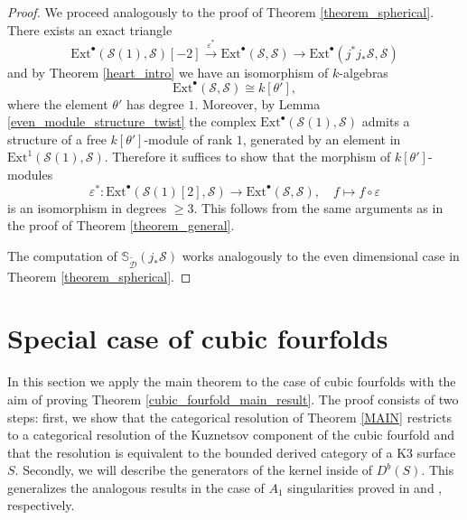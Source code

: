 \documentclass[a4paper, twoside, 11pt]{amsart}
\theoremstyle{definition}
\theoremstyle{remark}
\numberwithin{equation}{theorem}
\begin{document}
\begin{proof}
    We proceed analogously to the proof of Theorem \ref{theorem_spherical}. There exists an exact triangle 
    \begin{equation*}
		\mathrm{Ext}^{\bullet}(\mathcal{S}(1), \mathcal{S})[-2] \overset{\varepsilon^*}{\longrightarrow} \mathrm{Ext}^{\bullet}(\mathcal{S}, \mathcal{S}) \longrightarrow \mathrm{Ext}^{\bullet}(j^*j_*\mathcal{S}, \mathcal{S}) 
	\end{equation*} 
    and by Theorem \ref{heart_intro} we have an isomorphism of $k$-algebras
    \begin{equation*}
       \mathrm{Ext}^{\bullet}(\mathcal{S}, \mathcal{S}) \cong k[\theta'],
    \end{equation*}
    where the element $\theta'$ has degree $1$. Moreover, by Lemma \ref{even_module_structure_twist} the complex $\mathrm{Ext}^{\bullet}(\mathcal{S}(1), \mathcal{S})$ admits a structure of a free $k[\theta']$-module of rank $1$, generated by an element in $\mathrm{Ext}^1(\mathcal{S}(1), \mathcal{S})$. Therefore it suffices to show that the morphism of $k[\theta']$-modules 
    \begin{equation}\label{even_composition_ext}
		 \varepsilon^* \colon \mathrm{Ext}^{\bullet}(\mathcal{S}(1)[2], \mathcal{S}) \longrightarrow \mathrm{Ext}^{\bullet}(\mathcal{S}, \mathcal{S}), \quad f \mapsto f \circ \varepsilon
	\end{equation}
    is an isomorphism in degrees $\geq 3$. This follows from the same arguments as in the proof of Theorem  \ref{theorem_general}.

    The computation of $\mathbb{S}_{\widetilde{\mathcal{D}}}(j_*\mathcal{S})$ works analogously to the even dimensional case in Theorem \ref{theorem_spherical}.
\end{proof}

\section{Special case of cubic fourfolds}\label{kernels_cubic} 
In this section we apply the main theorem to the case of cubic fourfolds with the aim of proving Theorem \ref{cubic_fourfold_main_result}. The proof consists of two steps: first, we show that the categorical resolution of Theorem \ref{MAIN} restricts to a categorical resolution of the Kuznetsov component of the cubic fourfold and that the resolution is equivalent to the bounded derived category of a K3 surface $S$. Secondly, we will describe the generators of the kernel inside of $D^b(S)$. This generalizes the analogous results in the case of $A_1$ singularities proved in \cite[§5]{dervied_cat_cubic_fourfold} and \cite[§4]{Kernels_nodal}, respectively.
\end{document}
